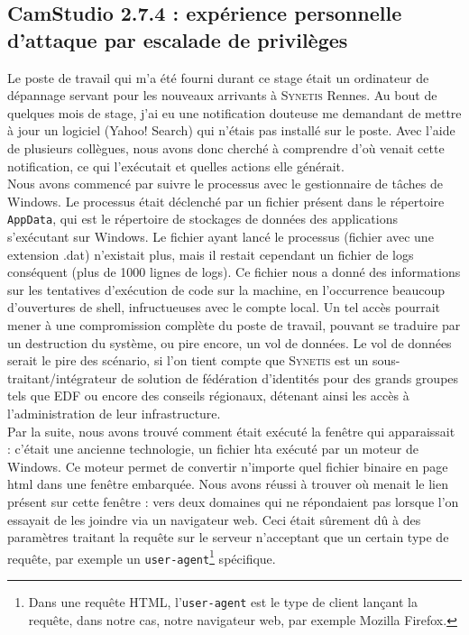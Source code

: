 \subsection{CamStudio 2.7.4 : expérience personnelle d'attaque par escalade de privilèges}
\label{subsec:camstudio}

Le poste de travail qui m'a été fourni durant ce stage était un ordinateur de dépannage servant pour les nouveaux arrivants à \textsc{Synetis} Rennes. Au bout de quelques mois de stage, j'ai eu une notification douteuse me demandant de mettre à jour un logiciel (Yahoo! Search) qui n'étais pas installé sur le poste. Avec l'aide de plusieurs collègues, nous avons donc cherché à comprendre d'où venait cette notification, ce qui l'exécutait et quelles actions elle générait.\\
Nous avons commencé par suivre le processus avec le gestionnaire de tâches de Windows. Le processus était déclenché par un fichier présent dans le répertoire \texttt{AppData}, qui est le répertoire de stockages de données des applications s'exécutant sur Windows. Le fichier ayant lancé le processus (fichier avec une extension .dat) n'existait plus, mais il restait cependant un fichier de logs conséquent (plus de 1000 lignes de logs). Ce fichier nous a donné des informations sur les tentatives d'exécution de code sur la machine, en l'occurrence beaucoup d'ouvertures de shell, infructueuses avec le compte local. Un tel accès pourrait mener à une compromission complète du poste de travail, pouvant se traduire par un destruction du système, ou pire encore, un vol de données. Le vol de données serait le pire des scénario, si l'on tient compte que \textsc{Synetis} est un sous-traitant/intégrateur de solution de fédération d'identités pour des grands groupes tels que EDF ou encore des conseils régionaux, détenant ainsi les accès à l'administration de leur infrastructure.\\
Par la suite, nous avons trouvé comment était exécuté la fenêtre qui apparaissait : c'était une ancienne technologie, un fichier hta exécuté par un moteur de Windows. Ce moteur permet de convertir n'importe quel fichier binaire en page html dans une fenêtre embarquée. Nous avons réussi à trouver où menait le lien présent sur cette fenêtre : vers deux domaines qui ne répondaient pas lorsque l'on essayait de les joindre via un navigateur web. Ceci était sûrement dû à des paramètres traitant la requête sur le serveur n'acceptant que un certain type de requête, par exemple un \texttt{user-agent}\footnote{Dans une requête HTML, l'\texttt{user-agent} est le type de client lançant la requête, dans notre cas, notre navigateur web, par exemple Mozilla Firefox.} spécifique.\\
